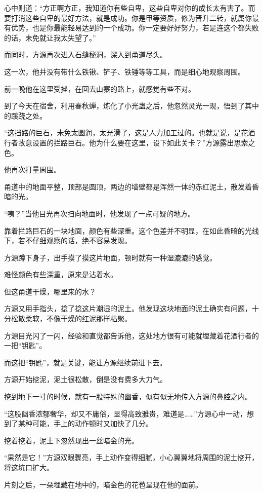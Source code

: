 \begin{this_body}
心中则道：“方正啊方正，我知道你有些自卑，这些自卑对你的成长太有害了。而要打消这些自卑的最好方法，就是成功。你是甲等资质，修为晋升二转，就属你最有优势，也是你最能轻易达到的一个成功。你一定要好好努力，若是连这个都失败的话，未免就让我太失望了。”

而同时，方源再次进入石缝秘洞，深入到甬道尽头。

这一次，他并没有带什么铁锹、铲子、铁锤等等工具，而是细心地观察周围。

前一晚他在这里受挫，在回去山寨的路上，就感觉有些不对。

到了今天在宿舍，利用春秋蝉，炼化了小光蛊之后，他忽然灵光一现，悟到了其中的蹊跷之处。

“这挡路的巨石，未免太圆润，太光滑了，这是人力加工过的。也就是说，是花酒行者故意设置的拦路巨石。他为什么要在这里，设下如此关卡？”方源露出思索之色。

他再次打量周围。

甬道中的地面平整，顶部是圆顶，两边的墙壁都是浑然一体的赤红泥土，散发着昏暗的光。

“咦？”当他目光再次扫向地面时，他发现了一点可疑的地方。

靠着拦路巨石的一块地面，颜色有些深重。这个色差并不明显，在如此昏暗的光线下，若不仔细观察的话，绝不容易发现。

方源蹲下身子，出手摸了摸这片地面，顿时就有一种湿漉漉的感觉。

难怪颜色有些深重，原来是沾着水。

但这甬道干燥，哪里来的水？

方源又用手指头，捻了捻这片潮湿的泥土。他发现这块地面的泥土确实有问题，十分松散柔软，不像干燥的红泥那样粘聚。

方源目光闪了一闪，经验和直觉都告诉他，这处地方很有可能就埋藏着花酒行者的一把“钥匙”。

而这把“钥匙”，就是关键，能让方源继续前进下去。

方源开始挖泥，泥土很松散，倒是没有费多大力气。

挖到地下一寸的时候，就有一股特殊的幽香，似有似无地传入方源的鼻腔之内。

“这股幽香浓郁奢华，却又不庸俗，显得高致雅贵，难道是……”方源心中一动，想到了某种可能，手上的动作顿时又加快了几分。

挖着挖着，泥土下忽然现出一丝暗金的光。

“果然是它！”方源双眼骤亮，手上动作变得细腻，小心翼翼地将周围的泥土挖开，将这坑口扩大。

片刻之后，一朵埋藏在地中的，暗金色的花苞呈现在他的面前。


\end{this_body}
